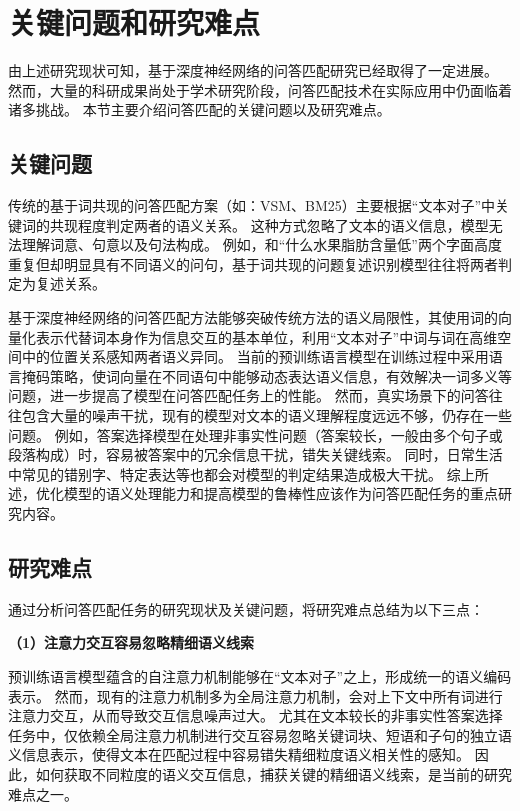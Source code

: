 \section{关键问题和研究难点}

由上述研究现状可知，基于深度神经网络的问答匹配研究已经取得了一定进展。
然而，大量的科研成果尚处于学术研究阶段，问答匹配技术在实际应用中仍面临着诸多挑战。
本节主要介绍问答匹配的关键问题以及研究难点。

\subsection{关键问题}

传统的基于词共现的问答匹配方案（如：VSM、BM25）主要根据“文本对子”中关键词的共现程度判定两者的语义关系。
这种方式忽略了文本的语义信息，模型无法理解词意、句意以及句法构成。
例如，{}和{\kai“什么水果脂肪含量低”}两个字面高度重复但却明显具有不同语义的问句，基于词共现的问题复述识别模型往往将两者判定为复述关系。

基于深度神经网络的问答匹配方法能够突破传统方法的语义局限性，其使用词的向量化表示代替词本身作为信息交互的基本单位，利用“文本对子”中词与词在高维空间中的位置关系感知两者语义异同。
当前的预训练语言模型在训练过程中采用语言掩码策略，使词向量在不同语句中能够动态表达语义信息，有效解决一词多义等问题，进一步提高了模型在问答匹配任务上的性能。
然而，真实场景下的问答往往包含大量的噪声干扰，现有的模型对文本的语义理解程度远远不够，仍存在一些问题。
例如，答案选择模型在处理非事实性问题（答案较长，一般由多个句子或段落构成）时，容易被答案中的冗余信息干扰，错失关键线索。
同时，日常生活中常见的错别字、特定表达等也都会对模型的判定结果造成极大干扰。
综上所述，优化模型的语义处理能力和提高模型的鲁棒性应该作为问答匹配任务的重点研究内容。


\subsection{研究难点}

通过分析问答匹配任务的研究现状及关键问题，将研究难点总结为以下三点：

\textbf{\songti （1）注意力交互容易忽略精细语义线索}

预训练语言模型蕴含的自注意力机制能够在“文本对子”之上，形成统一的语义编码表示。
然而，现有的注意力机制多为全局注意力机制，会对上下文中所有词进行注意力交互，从而导致交互信息噪声过大。
尤其在文本较长的非事实性答案选择任务中，仅依赖全局注意力机制进行交互容易忽略关键词块、短语和子句的独立语义信息表示，使得文本在匹配过程中容易错失精细粒度语义相关性的感知。
因此，如何获取不同粒度的语义交互信息，捕获关键的精细语义线索，是当前的研究难点之一。

